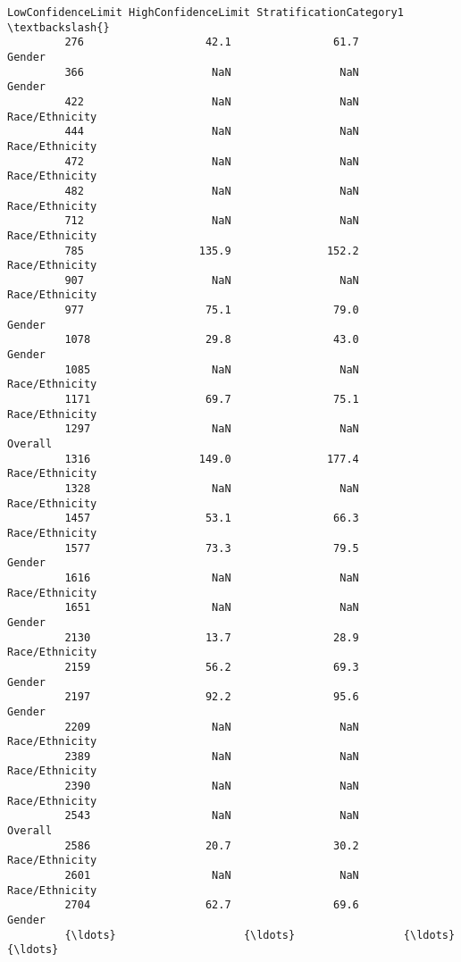 \documentclass[11pt]{article}
\begin{document}
\begin{Verbatim}[commandchars=\\\{\}]
                 LowConfidenceLimit HighConfidenceLimit StratificationCategory1  \textbackslash{}
         276                   42.1                61.7                  Gender   
         366                    NaN                 NaN                  Gender   
         422                    NaN                 NaN          Race/Ethnicity   
         444                    NaN                 NaN          Race/Ethnicity   
         472                    NaN                 NaN          Race/Ethnicity   
         482                    NaN                 NaN          Race/Ethnicity   
         712                    NaN                 NaN          Race/Ethnicity   
         785                  135.9               152.2          Race/Ethnicity   
         907                    NaN                 NaN          Race/Ethnicity   
         977                   75.1                79.0                  Gender   
         1078                  29.8                43.0                  Gender   
         1085                   NaN                 NaN          Race/Ethnicity   
         1171                  69.7                75.1          Race/Ethnicity   
         1297                   NaN                 NaN                 Overall   
         1316                 149.0               177.4          Race/Ethnicity   
         1328                   NaN                 NaN          Race/Ethnicity   
         1457                  53.1                66.3          Race/Ethnicity   
         1577                  73.3                79.5                  Gender   
         1616                   NaN                 NaN          Race/Ethnicity   
         1651                   NaN                 NaN                  Gender   
         2130                  13.7                28.9          Race/Ethnicity   
         2159                  56.2                69.3                  Gender   
         2197                  92.2                95.6                  Gender   
         2209                   NaN                 NaN          Race/Ethnicity   
         2389                   NaN                 NaN          Race/Ethnicity   
         2390                   NaN                 NaN          Race/Ethnicity   
         2543                   NaN                 NaN                 Overall   
         2586                  20.7                30.2          Race/Ethnicity   
         2601                   NaN                 NaN          Race/Ethnicity   
         2704                  62.7                69.6                  Gender   
         {\ldots}                    {\ldots}                 {\ldots}                     {\ldots}   

\end{Verbatim}
\end{document}
